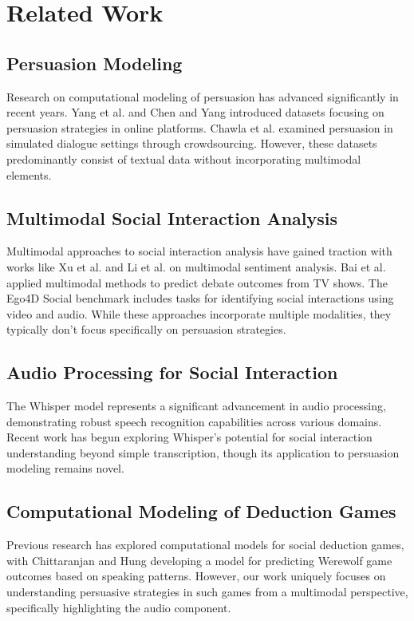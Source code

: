 \documentclass{article}
\begin{document}
\section{Related Work}
\subsection{Persuasion Modeling}
Research on computational modeling of persuasion has advanced significantly in recent years. Yang et al. \cite{yang2019let} and Chen and Yang \cite{chen2021advisorqagc} introduced datasets focusing on persuasion strategies in online platforms. Chawla et al. \cite{chawla2021casino} examined persuasion in simulated dialogue settings through crowdsourcing. However, these datasets predominantly consist of textual data without incorporating multimodal elements.

\subsection{Multimodal Social Interaction Analysis}
Multimodal approaches to social interaction analysis have gained traction with works like Xu et al. \cite{xu2021learning} and Li et al. \cite{li2020deep} on multimodal sentiment analysis. Bai et al. \cite{bai2021power} applied multimodal methods to predict debate outcomes from TV shows. The Ego4D Social benchmark \cite{grauman2022ego4d} includes tasks for identifying social interactions using video and audio. While these approaches incorporate multiple modalities, they typically don't focus specifically on persuasion strategies.

\subsection{Audio Processing for Social Interaction}
The Whisper model \cite{radford2022robust} represents a significant advancement in audio processing, demonstrating robust speech recognition capabilities across various domains. Recent work has begun exploring Whisper's potential for social interaction understanding beyond simple transcription, though its application to persuasion modeling remains novel.

\subsection{Computational Modeling of Deduction Games}
Previous research has explored computational models for social deduction games, with Chittaranjan and Hung \cite{chittaranjan2010you} developing a model for predicting Werewolf game outcomes based on speaking patterns. However, our work uniquely focuses on understanding persuasive strategies in such games from a multimodal perspective, specifically highlighting the audio component.
\end{document}
